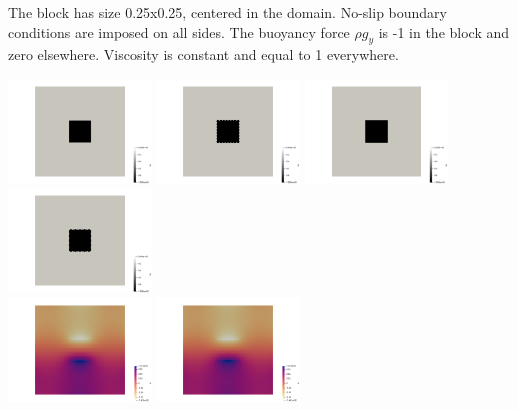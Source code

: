 The block has size 0.25x0.25, centered in the domain. No-slip boundary conditions are imposed on all 
sides. The buoyancy force $\rho g_y$ is -1 in the block and zero elsewhere. Viscosity is constant and 
equal to 1 everywhere. 

\begin{center}
\includegraphics[width=3.8cm]{python_codes/fieldstone_78/results/block/reduced/by0}
\includegraphics[width=3.8cm]{python_codes/fieldstone_78/results/block/reduced/by1}
\includegraphics[width=3.8cm]{python_codes/fieldstone_78/results/block/reduced/by2}
\includegraphics[width=3.8cm]{python_codes/fieldstone_78/results/block/reduced/by3}\\
\includegraphics[width=3.8cm]{python_codes/fieldstone_78/results/block/reduced/p0}
\includegraphics[width=3.8cm]{python_codes/fieldstone_78/results/block/reduced/p1}

\end{center}
